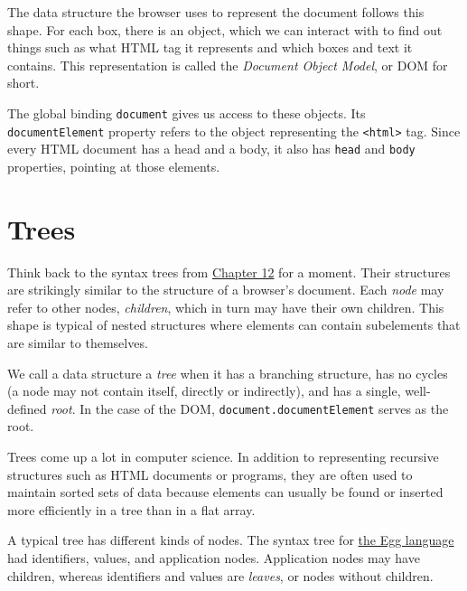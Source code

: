 The data structure the browser uses to represent the document follows this shape. For each box, there is an object, which we can interact with to find out things such as what HTML tag it represents and which boxes and text it contains. This representation is called the \emph{Document Object Model}, or DOM for short.

The global binding \lstinline`document` gives us access to these objects. Its \lstinline`documentElement` property refers to the object representing the \lstinline`<html>` tag. Since every HTML document has a head and a body, it also has \lstinline`head` and \lstinline`body` properties, pointing at those elements.

\section{Trees}

Think back to the syntax trees from \hyperref[language.parsing]{Chapter 12} for a moment. Their structures are strikingly similar to the structure of a browser's document. Each \emph{node} may refer to other nodes, \emph{children}, which in turn may have their own children. This shape is typical of nested structures where elements can contain subelements that are similar to themselves.

We call a data structure a \emph{tree} when it has a branching structure, has no cycles (a node may not contain itself, directly or indirectly), and has a single, well-defined \emph{root}. In the case of the DOM, \lstinline`document.documentElement` serves as the root.

Trees come up a lot in computer science. In addition to representing recursive structures such as HTML documents or programs, they are often used to maintain sorted sets of data because elements can usually be found or inserted more efficiently in a tree than in a flat array.

A typical tree has different kinds of nodes. The syntax tree for \hyperref[language]{the Egg language} had identifiers, values, and application nodes. Application nodes may have children, whereas identifiers and values are \emph{leaves}, or nodes without children.

